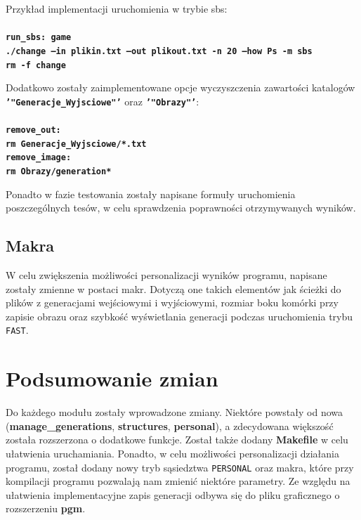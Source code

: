\documentclass[a4paper]{article}
\begin{document}
Przyk\l{}ad implementacji uruchomienia w trybie sbs:\\ \\
\textbf{\texttt{run\_sbs: game \\
        ./change --in plikin.txt --out plikout.txt  -n 20 --how Ps -m sbs\\ 
        rm -f change\\
}}

Dodatkowo zosta\l{}y zaimplementowane opcje wyczyszczenia zawarto\'sci katalog\'ow \textbf{\texttt{'"Generacje\_Wyjsciowe"'}} oraz \textbf{\texttt{'"Obrazy"'}}:\\ \\
\textbf{\texttt{remove\_out:\\
        rm Generacje\_Wyjsciowe/*.txt \\
remove\_image:\\
        rm Obrazy/generation*\\
}}


Ponadto w fazie testowania zosta\l{}y napisane formu\l{}y uruchomienia poszczeg\'olnych tes\'ow, w celu sprawdzenia poprawno\'sci otrzymywanych wynik\'ow.

\subsection{Makra}

\quad W celu zwi\k{e}kszenia mo\.zliwo\'sci personalizacji wynik\'ow programu, napisane zosta\l{}y zmienne w postaci makr.
Dotycz\k{a} one takich element\'ow jak \'scie\.zki do plik\'ow z generacjami wej\'sciowymi i wyj\'sciowymi, 
rozmiar boku kom\'orki przy zapisie obrazu oraz szybko\'s\'c wy\'swietlania generacji podczas uruchomienia trybu \texttt{FAST}.

\section{Podsumowanie zmian}

\quad Do ka\.zdego modu\l{}u zosta\l{}y wprowadzone zmiany. Niekt\'ore powsta\l{}y od nowa (\textbf{manage\_generations}, \textbf{structures}, \textbf{personal}), 
a zdecydowana wi\k{e}kszo\'s\'c zosta\l{}a rozszerzona o dodatkowe funkcje.
Zosta\l{} tak\.ze dodany \textbf{Makefile} w celu u\l{}atwienia uruchamiania.
Ponadto, w celu mo\.zliwo\'sci personalizacji dzia\l{}ania programu, zosta\l{} dodany nowy tryb s\k{a}siedztwa \texttt{PERSONAL} oraz makra,
kt\'ore przy kompilacji programu pozwalaj\k{a} nam zmieni\'c niekt\'ore parametry.
Ze wzgl\k{e}du na u\l{}atwienia implementacyjne zapis generacji odbywa si\k{e} do pliku graficznego o rozszerzeniu \textbf{pgm}.
\end{document}

